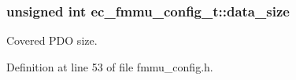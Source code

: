 \subsubsection[{data\-\_\-size}]{\setlength{\rightskip}{0pt plus 5cm}unsigned int {\bf ec\-\_\-fmmu\-\_\-config\-\_\-t\-::data\-\_\-size}}\label{structec__fmmu__config__t_aa3e8f3f8fa7be48f2a1497cd2fbe8ad5}


\-Covered \-P\-D\-O size. 



\-Definition at line 53 of file fmmu\-\_\-config.\-h.

